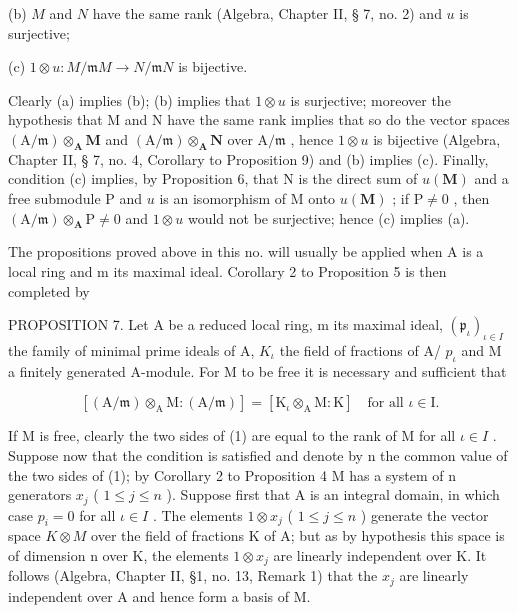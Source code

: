 (b) \(M\) and \(N\) have the same rank (Algebra, Chapter II, § 7, no. 2) and \(u\) is surjective;

(c) \(1 \otimes u: M/\mathfrak{m}M \to N/\mathfrak{m}N\) is bijective.

Clearly (a) implies (b); (b) implies that \(1 \otimes u\) is surjective; moreover the hypothesis that M and N have the same rank implies that so do the vector spaces \((\mathrm{A} / \mathfrak{m}) \otimes_{\mathbf{A}} \mathbf{M}\) and \((\mathrm{A} / \mathfrak{m}) \otimes_{\mathbf{A}} \mathbf{N}\) over \(\mathrm{A} / \mathfrak{m}\) , hence \(1 \otimes u\) is bijective (Algebra, Chapter II, § 7, no. 4, Corollary to Proposition 9) and (b) implies (c). Finally, condition (c) implies, by Proposition 6, that N is the direct sum of \(u(\mathbf{M})\) and a free submodule P and \(u\) is an isomorphism of M onto \(u(\mathbf{M})\) ; if \(\mathrm{P} \neq 0\) , then \((\mathrm{A} / \mathfrak{m}) \otimes_{\mathbf{A}} \mathrm{P} \neq 0\) and \(1 \otimes u\) would not be surjective; hence (c) implies (a).

The propositions proved above in this no. will usually be applied when A is a local ring and m its maximal ideal. Corollary 2 to Proposition 5 is then completed by

PROPOSITION 7. Let A be a reduced local ring, m its maximal ideal, \((\mathfrak{p}_{\iota})_{\iota \in I}\) the family of minimal prime ideals of A, \(K_{\iota}\) the field of fractions of A/ \(p_{\iota}\) and M a finitely generated A-module. For M to be free it is necessary and sufficient that

\[
[ (\mathrm{A} / \mathfrak {m}) \otimes_ {\mathrm{A}} \mathrm{M}: (\mathrm{A} / \mathfrak {m}) ] = [ \mathrm{K} _ {\iota} \otimes_ {\mathrm{A}} \mathrm{M}: \mathrm{K} ] \quad \text{for all }\iota \in \mathrm{I}.\tag{1}
\]

If M is free, clearly the two sides of (1) are equal to the rank of M for all \(\iota\in I\) . Suppose now that the condition is satisfied and denote by n the common value of the two sides of (1); by Corollary 2 to Proposition 4 M has a system of n generators \(x_{j}\) ( \(1\leqslant j\leqslant n\) ). Suppose first that A is an integral domain, in which case \(p_{i}=0\) for all \(\iota\in I\) . The elements \(1\otimes x_{j}\) ( \(1\leqslant j\leqslant n\) ) generate the vector space \(K\otimes M\) over the field of fractions K of A; but as by hypothesis this space is of dimension n over K, the elements \(1\otimes x_{j}\) are linearly independent over K. It follows (Algebra, Chapter II, §1, no. 13, Remark 1) that the \(x_{j}\) are linearly independent over A and hence form a basis of M.

